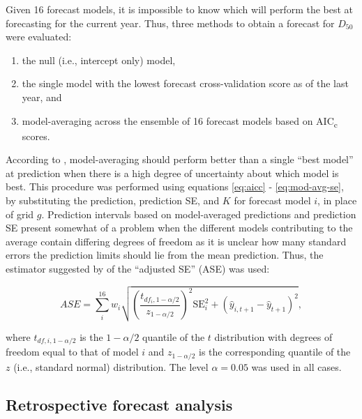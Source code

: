 \documentclass[12pt,]{book}
\providecommand{\tightlist}{%
  \setlength{\itemsep}{0pt}\setlength{\parskip}{0pt}}
\theoremstyle{definition}
\theoremstyle{definition}
\theoremstyle{definition}
\theoremstyle{remark}
\begin{document}
\noindent
Given 16 forecast models, it is impossible to know which will perform
the best at forecasting for the current year. Thus, three methods to
obtain a forecast for \(D_{50}\) were evaluated:

\begin{enumerate}
\def\labelenumi{(\arabic{enumi})}
\tightlist
\item
  the null (i.e., intercept only) model,
\item
  the single model with the lowest forecast cross-validation score as of
  the last year, and
\item
  model-averaging across the ensemble of 16 forecast models based on
  AIC\textsubscript{c} scores.
\end{enumerate}

\noindent
According to \citet{burnham-anderson-2002}, model-averaging should
perform better than a single ``best model'' at prediction when there is
a high degree of uncertainty about which model is best. This procedure
was performed using equations \eqref{eq:aicc} - \eqref{eq:mod-avg-se}, by
substituting the prediction, prediction SE, and \(K\) for forecast model
\(i\), in place of grid \(g\). Prediction intervals based on
model-averaged predictions and prediction SE present somewhat of a
problem when the different models contributing to the average contain
differing degrees of freedom as it is unclear how many standard errors
the prediction limits should lie from the mean prediction. Thus, the
estimator suggested by \citet{burnham-anderson-2002} of the ``adjusted
SE'' (ASE) was used:

\begin{equation}
  ASE=\sum_i^{16} w_i \sqrt{\left(\frac{t_{df_i,1-\alpha/2}}{z_{1-\alpha/2}}\right)^2 \text{SE}_i^2+(\hat{y}_{i,t+1}-\hat{y}_{t+1})^2},
\label{eq:ase}
\end{equation}

\noindent
where \(t_{df,i,1-\alpha/2}\) is the \(1-\alpha/2\) quantile of the
\(t\) distribution with degrees of freedom equal to that of model \(i\)
and \(z_{1-\alpha/2}\) is the corresponding quantile of the \(z\) (i.e.,
standard normal) distribution. The level \(\alpha = 0.05\) was used in
all cases.

\subsection{Retrospective forecast analysis}\label{retro}
\end{document}
